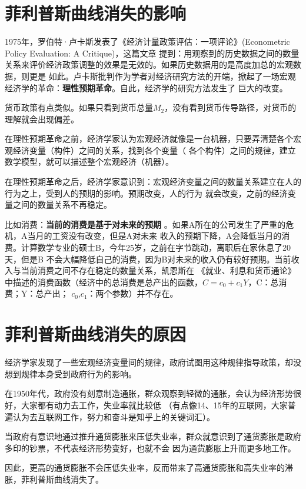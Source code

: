 \documentclass[UTF8]{article}
\begin{document}
\section{菲利普斯曲线消失的影响}
    1975年，罗伯特·卢卡斯发表了《经济计量政策评估：一项评论》(Econometric Policy Evaluation: A Critique)，这篇文章
    提到：用观察到的历史数据之间的数量关系来评价经济政策调整的效果是无效的。如果历史数据用的是高度加总的宏观数据，则更是
    如此。卢卡斯批判作为学者对经济研究方法的开端，掀起了一场宏观经济学的革命：\textbf{理性预期革命}。自此，经济学的研究方法发生了
    巨大的改变。\par
    货币政策有点类似。如果只看到货币总量$M_{2}$，没有看到货币传导路径，对货币的理解就会出现偏差。\par
    在理性预期革命之前，经济学家认为宏观经济就像是一台机器，只要弄清楚各个宏观经济变量（构件）之间的关系，找到各个变量（
    各个构件）之间的规律，建立数学模型，就可以描述整个宏观经济（机器）。\par
    在理性预期革命之后，经济学家意识到：宏观经济变量之间的数量关系建立在人的行为之上，受到人的预期的影响。预期改变，人的行为
    就会改变，之前的经济变量之间的数量关系不再稳定。\par
    比如消费：\textbf{当前的消费是基于对未来的预期}  。如果A所在的公司发生了严重的危机，A当月的工资没有改变，但是A对未来
    收入的预期下降，A会降低当月的消费。计算数学专业的硕士B，今年25岁，之前在字节跳动，离职后在家休息了20天，但是B
    不会大幅降低自己的消费，因为B对未来的收入仍有较好预期。当前收入与当前消费之间不存在稳定的数量关系，凯恩斯在
    《就业、利息和货币通论》中描述的消费函数（经济中的总消费是总产出的函数，$C = c_{0} + c_{1}Y$，C：总消费；Y：总产出；
    $c_{0}$,$c_{1}$：两个参数）并不存在。

\section{菲利普斯曲线消失的原因}
    经济学家发现了一些宏观经济变量间的规律，政府试图用这种规律指导政策，却没想到规律本身受到政府行为的影响。\par
    在1950年代，政府没有刻意制造通胀，群众观察到轻微的通胀，会认为经济形势很好，大家都有动力去工作，失业率就比较低
    （有点像14、15年的互联网，大家普遍认为去互联网工作，努力和奋斗是知乎上的关键词汇）。\par
    当政府有意识地通过推升通货膨胀来压低失业率，群众就意识到了通货膨胀是政府多印的钞票，不代表经济形势变好，也就不会
    因为通货膨胀上升而更多地工作。\par
    因此，更高的通货膨胀不会压低失业率，反而带来了高通货膨胀和高失业率的滞胀，菲利普斯曲线消失了。
\end{document}
